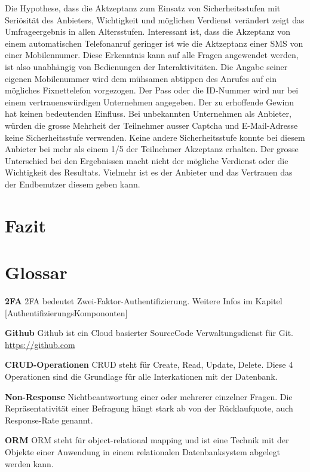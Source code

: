 Die Hypothese, dass die Aktzeptanz zum Einsatz von Sicherheitsstufen mit
Seriösität des Anbieters, Wichtigkeit und möglichen Verdienst verändert
zeigt das Umfrageergebnis in allen Altersstufen. Interessant ist, dass
die Akzeptanz von einem automatischen Telefonanruf geringer ist wie die
Aktzeptanz einer SMS von einer Mobilennumer. Diese Erkenntnis kann auf
alle Fragen angewendet werden, ist also unabhängig von Bedienungen der
Interaktivitäten. Die Angabe seiner eigenen Mobilenummer wird dem
mühsamen abtippen des Anrufes auf ein mögliches Fixnettelefon
vorgezogen. Der Pass oder die ID-Nummer wird nur bei einem
vertrauenswürdigen Unternehmen angegeben. Der zu erhoffende Gewinn hat
keinen bedeutenden Einfluss. Bei unbekannten Unternehmen als Anbieter,
würden die grosse Mehrheit der Teilnehmer ausser Captcha und
E-Mail-Adresse keine Sicherheitsstufe verwenden. Keine andere
Sicherheitsstufe konnte bei diesem Anbieter bei mehr als einem 1/5 der
Teilnehmer Akzeptanz erhalten. Der grosse Unterschied bei den
Ergebnissen macht nicht der mögliche Verdienst oder die Wichtigkeit des
Resultats. Vielmehr ist es der Anbieter und das Vertrauen das der
Endbenutzer diesem geben kann.

\chapter{Fazit}\label{fazit-2}

\newpage

\appendix

\hypertarget{glossar}{\chapter{Glossar}\label{glossar}}

\textbf{2FA} 2FA bedeutet Zwei-Faktor-Authentifizierung. Weitere Infos
im Kapitel {[}AuthentifizierungsKompononten{]}

\textbf{Github} Github ist ein Cloud basierter SourceCode
Verwaltungsdienst für Git. \url{https://github.com}

\textbf{CRUD-Operationen} CRUD steht für Create, Read, Update, Delete.
Diese 4 Operationen sind die Grundlage für alle Interkationen mit der
Datenbank.

\textbf{Non-Response} Nichtbeantwortung einer oder mehrerer einzelner
Fragen. Die Repräsentativität einer Befragung hängt stark ab von der
Rücklaufquote, auch Response-Rate genannt.

\textbf{ORM} ORM steht für object-relational mapping und ist eine
Technik mit der Objekte einer Anwendung in einem relationalen
Datenbanksystem abgelegt werden kann.

